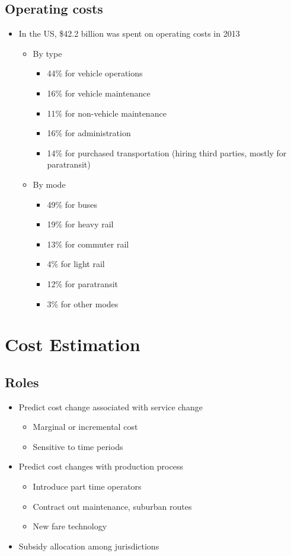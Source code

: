 \documentclass[11pt]{article}
\begin{document}
\subsection{Operating costs}
\label{sec:org071d821}
\begin{itemize}
\item In the US, \$42.2 billion was spent on operating costs in 2013
\begin{itemize}
\item By type
\begin{itemize}
\item 44\% for vehicle operations
\item 16\% for vehicle maintenance
\item 11\% for non-vehicle maintenance
\item 16\% for administration
\item 14\% for purchased transportation (hiring third parties, mostly for paratransit)
\end{itemize}
\item By mode
\begin{itemize}
\item 49\% for buses
\item 19\% for heavy rail
\item 13\% for commuter rail
\item 4\% for light rail
\item 12\% for paratransit
\item 3\% for other modes
\end{itemize}
\end{itemize}
\end{itemize}

\section{Cost Estimation}
\label{sec:orgf89da06}

\subsection{Roles}
\label{sec:org67ad4e8}
\begin{itemize}
\item Predict cost change associated with service change
\begin{itemize}
\item Marginal or incremental cost
\item Sensitive to time periods
\end{itemize}
\item Predict cost changes with production process
\begin{itemize}
\item Introduce part time operators
\item Contract out maintenance, suburban routes
\item New fare technology
\end{itemize}
\item Subsidy allocation among jurisdictions
\end{itemize}
\end{document}
